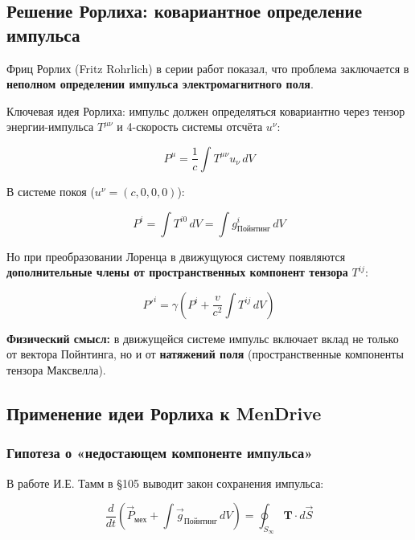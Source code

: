 \documentclass[a4paper,12pt]{article}
\begin{document}
\subsection{Решение Рорлиха: ковариантное определение импульса}

Фриц Рорлих (Fritz Rohrlich) в серии работ \cite{Rohrlich1960, Rohrlich1966,
Rohrlich1970, Rohrlich1982, Rohrlich1997} показал, что проблема заключается
в \textbf{неполном определении импульса электромагнитного поля}.

Ключевая идея Рорлиха: импульс должен определяться ковариантно через
тензор энергии-импульса $T^{\mu\nu}$ и 4-скорость системы отсчёта $u^\nu$:

\begin{equation}
P^\mu = \frac{1}{c} \int T^{\mu\nu} u_\nu \, dV
\label{eq:rohrlich_momentum}
\end{equation}

В системе покоя ($u^\nu = (c, 0, 0, 0)$):

\begin{equation}
P^i = \int T^{i0} \, dV = \int g^i_{\text{Пойнтинг}} \, dV
\end{equation}

Но при преобразовании Лоренца в движущуюся систему появляются
\textbf{дополнительные члены от пространственных компонент тензора} $T^{ij}$:

\begin{equation}
P'^i = \gamma \left( P^i + \frac{v}{c^2} \int T^{ij} \, dV \right)
\label{eq:lorentz_transform}
\end{equation}

\textbf{Физический смысл:} в движущейся системе импульс включает вклад не
только от вектора Пойнтинга, но и от \textbf{натяжений поля} (пространственные
компоненты тензора Максвелла).

\subsection{Применение идеи Рорлиха к MenDrive}

\subsubsection{Гипотеза о «недостающем компоненте импульса»}

В работе \cite{Tamm} И.Е. Тамм в \S 105 выводит закон сохранения импульса:

\begin{equation}
\frac{d}{dt} \left( \vec{P}_{\text{мех}} + \int \vec{g}_{\text{Пойнтинг}} \, dV
\right) = \oint_{S_\infty} \mathbf{T} \cdot d\vec{S}
\label{eq:tamm_105}
\end{equation}
\end{document}
